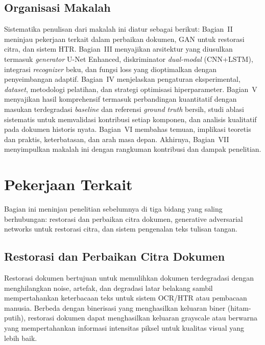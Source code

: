 \documentclass[journal]{IEEEtran}
\begin{document}
\subsection{Organisasi Makalah}

Sistematika penulisan dari makalah ini diatur sebagai berikut: Bagian~II meninjau pekerjaan terkait dalam perbaikan dokumen, GAN untuk restorasi citra, dan sistem HTR. Bagian~III menyajikan arsitektur yang diusulkan termasuk \textit{generator} U-Net Enhanced, diskriminator \textit{dual-modal} (CNN+LSTM), integrasi \textit{recognizer} beku, dan fungsi loss yang dioptimalkan dengan penyeimbangan adaptif. Bagian~IV menjelaskan pengaturan eksperimental, \textit{dataset}, metodologi pelatihan, dan strategi optimisasi hiperparameter. Bagian~V menyajikan hasil komprehensif termasuk perbandingan kuantitatif dengan masukan terdegradasi \textit{baseline} dan referensi \textit{ground truth} bersih, studi ablasi sistematis untuk memvalidasi kontribusi setiap komponen, dan analisis kualitatif pada dokumen historis nyata. Bagian~VI membahas temuan, implikasi teoretis dan praktis, keterbatasan, dan arah masa depan. Akhirnya, Bagian~VII menyimpulkan makalah ini dengan rangkuman kontribusi dan dampak penelitian.

\section{Pekerjaan Terkait}

Bagian ini meninjau penelitian sebelumnya di tiga bidang yang saling berhubungan: restorasi dan perbaikan citra dokumen, generative adversarial networks untuk restorasi citra, dan sistem pengenalan teks tulisan tangan.

\subsection{Restorasi dan Perbaikan Citra Dokumen}

Restorasi dokumen bertujuan untuk memulihkan dokumen terdegradasi dengan menghilangkan noise, artefak, dan degradasi latar belakang sambil mempertahankan keterbacaan teks untuk sistem OCR/HTR atau pembacaan manusia. Berbeda dengan binerisasi yang menghasilkan keluaran biner (hitam-putih), restorasi dokumen dapat menghasilkan keluaran grayscale atau berwarna yang mempertahankan informasi intensitas piksel untuk kualitas visual yang lebih baik.
\end{document}
